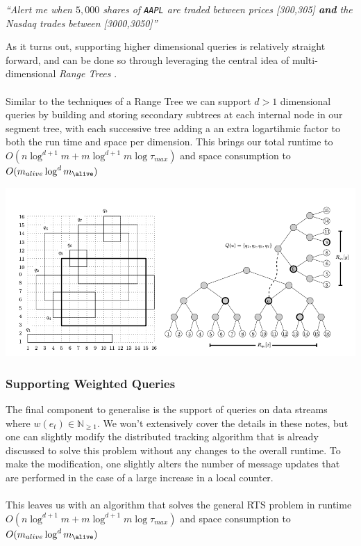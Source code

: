 \documentclass{article}
\begin{document}
\begin{center}
    \textit{``Alert me when $5,000$ shares of \texttt{AAPL} are traded between prices [300,305] \textbf{and} the Nasdaq trades between [3000,3050]''}
\end{center}
As it turns out, supporting higher dimensional queries is relatively straight forward, and can be done so through leveraging the central idea of multi-dimensional \textit{Range Trees} \cite{RTrees, DeBerg}. \\ 
\\
Similar to the techniques of a Range Tree we can support  $d>1$ dimensional queries by building and storing secondary subtrees at each internal node in our segment tree, with each successive tree adding a an extra logartihmic factor to both the run time and space per dimension. This brings our total runtime to $O(n\log^{d+1} m + m\log^{d+1} m\log\tau_{max})$ and space consumption to $O(m_{alive}\log^{d}m_{\alive})$

\begin{center}
    \includegraphics[scale=0.4]{images/rangetree.png}
\end{center}

\subsubsection*{Supporting Weighted Queries}
The final component to generalise is the support of queries on data streams where $w(e_t) \in \mathbb{N}_{\geq1}$. We won't extensively cover the details in these notes, but one can slightly modify the distributed tracking algorithm that is already discussed to solve this problem without any changes to the overall runtime. To make the modification, one slightly alters the number of message updates that are performed in the case of a large increase in a local counter. \\
\\
This leaves us with an algorithm that solves the general RTS problem in runtime $O(n\log^{d+1} m + m\log^{d+1} m\log\tau_{max})$ and space consumption to $O(m_{alive}\log^{d}m_{\alive})$






\newpage

\end{document}
